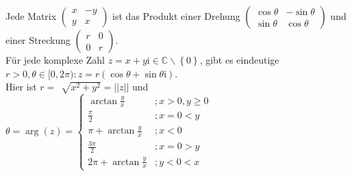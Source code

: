 \documentclass[a4paper,12pt]{article}
\numberwithin{equation}{section}
\begin{document}
Jede Matrix $\begin{pmatrix}
        x&-y\\y&x
\end{pmatrix}$ ist das Produkt einer Drehung $\begin{pmatrix}
        \cos \theta &-\sin \theta \\\sin \theta &\cos \theta  
\end{pmatrix}$ und einer Streckung $\begin{pmatrix}
        r&0\\0&r
\end{pmatrix}$.\\
Für jede komplexe Zahl $z=x+y\text{i} \in \mathbb{C}\backslash \left\{0\right\}$, gibt es eindeutige $r>0,\theta  \in [0,2\pi):z=r\left(\cos \theta +\sin \theta \text{i}\right)$.\\\indent
Hier ist $r=\,\sqrt[]{x^2+y^2}=| |z| |$ und $\theta =\arg\left(z\right)=\begin{cases}
        \arctan \tfrac{y}{x}&;x>0,y\geq 0\\
        \tfrac{\pi }{2}&;x=0<y\\
        \pi +\arctan \tfrac{y}{x}&;x<0\\
        \tfrac{3\pi }{2}&;x=0>y\\
        2\pi +\arctan \tfrac{y}{x}&;y<0<x
\end{cases}$ 

\end{document}
